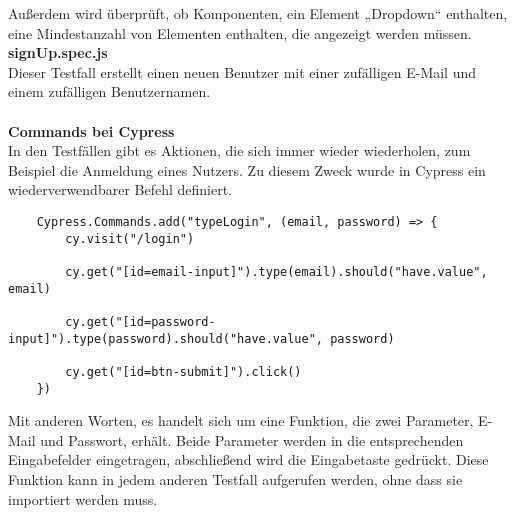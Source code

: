 Außerdem wird überprüft, ob Komponenten, ein Element „Dropdown“ enthalten, eine Mindestanzahl von Elementen enthalten, die angezeigt werden müssen. 
\\
\textbf{signUp.spec.js}\\
Dieser Testfall erstellt einen neuen Benutzer mit einer zufälligen E-Mail und einem zufälligen Benutzernamen.  \\
\\
\textbf{Commands bei Cypress}\\
In den Testfällen gibt es Aktionen, die sich immer wieder wiederholen, zum Beispiel die Anmeldung eines Nutzers.
Zu diesem Zweck wurde in Cypress ein wiederverwendbarer Befehl definiert.
\begin{lstlisting}
    Cypress.Commands.add("typeLogin", (email, password) => {
        cy.visit("/login")
    
        cy.get("[id=email-input]").type(email).should("have.value", email)
    
        cy.get("[id=password-input]").type(password).should("have.value", password)
    
        cy.get("[id=btn-submit]").click()
    })
\end{lstlisting}
Mit anderen Worten, es handelt sich um eine Funktion, die zwei Parameter, E-Mail und Passwort, erhält. 
Beide Parameter werden in die entsprechenden Eingabefelder eingetragen, abschließend wird die Eingabetaste gedrückt.
Diese Funktion kann in jedem anderen Testfall aufgerufen werden, ohne dass sie importiert werden muss.

